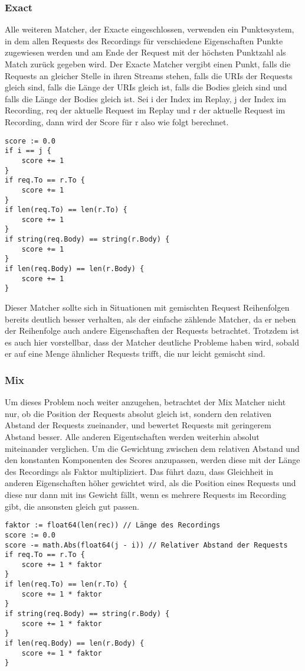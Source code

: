 \documentclass[12pt,a4paper]{report}
\begin{document}
\subsubsection{Exact}
Alle weiteren Matcher, der Exacte eingeschlossen, verwenden ein Punktesystem, in dem allen Requests des Recordings für verschiedene
Eigenschaften Punkte zugewiesen werden und am Ende der Request mit der höchsten Punktzahl als Match zurück gegeben wird.
Der Exacte Matcher vergibt einen Punkt, falls die Requests an gleicher Stelle in ihren Streams stehen, falls die URIs der
Requests gleich sind, falls die Länge der URIs gleich ist, falls die Bodies gleich sind und falls die Länge der Bodies gleich ist.
Sei i der Index im Replay, j der Index im Recording, req der aktuelle Request im Replay und r der aktuelle
Request im Recording, dann wird der Score für r also wie folgt berechnet.
\begin{verbatim}
score := 0.0
if i == j {
    score += 1
}
if req.To == r.To {
    score += 1
}
if len(req.To) == len(r.To) {
    score += 1
}
if string(req.Body) == string(r.Body) {
    score += 1
}
if len(req.Body) == len(r.Body) {
    score += 1
}
\end{verbatim}
Dieser Matcher sollte sich in Situationen mit gemischten Request Reihenfolgen bereits deutlich besser verhalten, als der
einfache zählende Matcher, da er neben der Reihenfolge auch andere Eigenschaften der Requests betrachtet. Trotzdem ist es auch
hier vorstellbar, dass der Matcher deutliche Probleme haben wird, sobald er auf eine Menge ähnlicher Requests trifft, die nur
leicht gemischt sind.
\subsubsection{Mix}
Um dieses Problem noch weiter anzugehen, betrachtet der Mix Matcher nicht nur, ob die Position der Requests absolut gleich
ist, sondern den relativen Abstand der Requests zueinander, und bewertet Requests mit geringerem Abstand besser. Alle
anderen Eigentschaften werden weiterhin absolut miteinander verglichen. Um die Gewichtung zwischen dem relativen Abstand
und den konstanten Komponenten des Scores anzupassen, werden diese mit der Länge des Recordings als Faktor multipliziert.
Das führt dazu, dass Gleichheit in anderen Eigenschaften höher gewichtet wird, als die Position eines Requests und diese
nur dann mit ins Gewicht fällt, wenn es mehrere Requests im Recording gibt, die ansonsten gleich gut passen.
\begin{verbatim}
faktor := float64(len(rec)) // Länge des Recordings
score := 0.0
score -= math.Abs(float64(j - i)) // Relativer Abstand der Requests
if req.To == r.To {
    score += 1 * faktor
}
if len(req.To) == len(r.To) {
    score += 1 * faktor
}
if string(req.Body) == string(r.Body) {
    score += 1 * faktor
}
if len(req.Body) == len(r.Body) {
    score += 1 * faktor
}
\end{verbatim}
\end{document}
